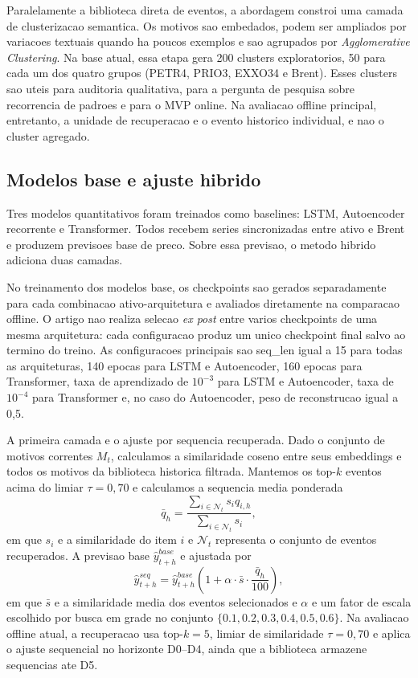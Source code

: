 \documentclass[12pt]{article}
\begin{document}
Paralelamente a biblioteca direta de eventos, a abordagem constroi uma camada de clusterizacao semantica. Os motivos sao embedados, podem ser ampliados por variacoes textuais quando ha poucos exemplos e sao agrupados por \textit{Agglomerative Clustering}. Na base atual, essa etapa gera 200 clusters exploratorios, 50 para cada um dos quatro grupos (PETR4, PRIO3, EXXO34 e Brent). Esses clusters sao uteis para auditoria qualitativa, para a pergunta de pesquisa sobre recorrencia de padroes e para o MVP online. Na avaliacao offline principal, entretanto, a unidade de recuperacao e o evento historico individual, e nao o cluster agregado.

\subsection{Modelos base e ajuste hibrido}

Tres modelos quantitativos foram treinados como baselines: LSTM, Autoencoder recorrente e Transformer. Todos recebem series sincronizadas entre ativo e Brent e produzem previsoes base de preco. Sobre essa previsao, o metodo hibrido adiciona duas camadas.

No treinamento dos modelos base, os checkpoints sao gerados separadamente para cada combinacao ativo-arquitetura e avaliados diretamente na comparacao offline. O artigo nao realiza selecao \textit{ex post} entre varios checkpoints de uma mesma arquitetura: cada configuracao produz um unico checkpoint final salvo ao termino do treino. As configuracoes principais sao seq\_len igual a 15 para todas as arquiteturas, 140 epocas para LSTM e Autoencoder, 160 epocas para Transformer, taxa de aprendizado de $10^{-3}$ para LSTM e Autoencoder, taxa de $10^{-4}$ para Transformer e, no caso do Autoencoder, peso de reconstrucao igual a 0,5.

A primeira camada e o ajuste por sequencia recuperada. Dado o conjunto de motivos correntes $M_t$, calculamos a similaridade coseno entre seus embeddings e todos os motivos da biblioteca historica filtrada. Mantemos os top-$k$ eventos acima do limiar $\tau = 0{,}70$ e calculamos a sequencia media ponderada
\[
\bar{q}_h = \frac{\sum_{i \in \mathcal{N}_t} s_i q_{i,h}}{\sum_{i \in \mathcal{N}_t} s_i},
\]
em que $s_i$ e a similaridade do item $i$ e $\mathcal{N}_t$ representa o conjunto de eventos recuperados. A previsao base $\hat{y}^{base}_{t+h}$ e ajustada por
\[
\hat{y}^{seq}_{t+h} = \hat{y}^{base}_{t+h}\left(1 + \alpha \cdot \bar{s} \cdot \frac{\bar{q}_h}{100}\right),
\]
em que $\bar{s}$ e a similaridade media dos eventos selecionados e $\alpha$ e um fator de escala escolhido por busca em grade no conjunto $\{0.1, 0.2, 0.3, 0.4, 0.5, 0.6\}$. Na avaliacao offline atual, a recuperacao usa top-$k=5$, limiar de similaridade $\tau = 0{,}70$ e aplica o ajuste sequencial no horizonte D0--D4, ainda que a biblioteca armazene sequencias ate D5.
\end{document}
